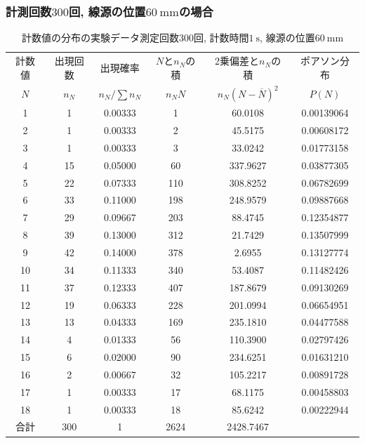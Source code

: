 \documentclass{jarticle}
\begin{document}
\subsubsection{計測回数$300$回, 線源の位置$60\ \mathrm{mm}$の場合}


\begin{table}[H]
  \caption{計数値の分布の実験データ\protect\linebreak 測定回数$300$回, 計数時間$1\ \mathrm{s}$, 線源の位置$60\ \mathrm{mm}$}
  \label{tb:count-distribution-60mm-300times}
  \hspace{-1cm}
  \begin{tabular}{cccccc}
    \hline
    計数値 & 出現回数 & 出現確率 & $N$と$n_N$の積 & 2乗偏差と$n_N$の積 & ポアソン分布 \\
    $N$ & $n_N$ & $n_N/\sum n_N$ & $n_N N$ & $n_N(N-\overline{N})^2$ & $P(N)$ \\
    \hline
    1 & 1 & 0.00333 & 1 & 60.0108 & 0.00139064 \\
    2 & 1 & 0.00333 & 2 & 45.5175 & 0.00608172 \\
    3 & 1 & 0.00333 & 3 & 33.0242 & 0.01773158 \\
    4 & 15 & 0.05000 & 60 & 337.9627 & 0.03877305 \\
    5 & 22 & 0.07333 & 110 & 308.8252 & 0.06782699 \\
    6 & 33 & 0.11000 & 198 & 248.9579 & 0.09887668 \\
    7 & 29 & 0.09667 & 203 & 88.4745 & 0.12354877 \\
    8 & 39 & 0.13000 & 312 & 21.7429 & 0.13507999 \\
    9 & 42 & 0.14000 & 378 & 2.6955 & 0.13127774 \\
    10 & 34 & 0.11333 & 340 & 53.4087 & 0.11482426 \\
    11 & 37 & 0.12333 & 407 & 187.8679 & 0.09130269 \\
    12 & 19 & 0.06333 & 228 & 201.0994 & 0.06654951 \\
    13 & 13 & 0.04333 & 169 & 235.1810 & 0.04477588 \\
    14 & 4 & 0.01333 & 56 & 110.3900 & 0.02797426 \\
    15 & 6 & 0.02000 & 90 & 234.6251 & 0.01631210 \\
    16 & 2 & 0.00667 & 32 & 105.2217 & 0.00891728 \\
    17 & 1 & 0.00333 & 17 & 68.1175 & 0.00458803 \\
    18 & 1 & 0.00333 & 18 & 85.6242 & 0.00222944 \\
    \hline
    合計 & 300 & 1 & 2624 & 2428.7467 & \\
    \hline
  \end{tabular}
\end{table}
\end{document}
